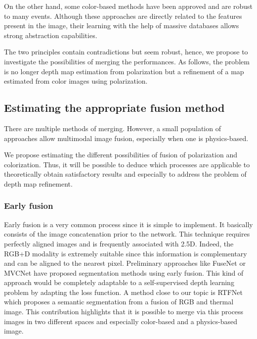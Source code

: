 On the other hand, some color-based methods have been approved and are robust to many events. Although these approaches are directly related to the features present in the image, their learning with the help of massive databases allows strong abstraction capabilities.

The two principles contain contradictions but seem robust, hence, we propose to investigate the possibilities of merging the performances. As follows, the problem is no longer depth map estimation from polarization but a refinement of a map estimated from color images using polarization.

\subsection{Estimating the appropriate fusion method}

There are multiple methods of merging. However, a small population of approaches allow multimodal image fusion, especially when one is physics-based.

We propose estimating the different possibilities of fusion of polarization and colorization. Thus, it will be possible to deduce which processes are applicable to theoretically obtain satisfactory results and especially to address the problem of depth map refinement.

\subsubsection{Early fusion}

Early fusion is a very common process since it is simple to implement. 
It basically consists of the image concatenation prior to the network. This technique requires perfectly aligned images and is frequently associated with 2.5D. Indeed, the RGB+D modality is extremely suitable since this information is complementary and can be aligned to the nearest pixel. 
Preliminary approaches like FuseNet \cite{hazirbas2016fusenet} or MVCNet \cite{ma2017multi} have proposed segmentation methods using early fusion. This kind of approach would be completely adaptable to a self-supervised depth learning problem by adapting the loss function.
A method close to our topic is RTFNet \cite{sun2019rtfnet} which proposes a semantic segmentation from a fusion of RGB and thermal image. This contribution highlights that it is possible to merge via this process images in two different spaces and especially color-based and a physics-based image.

